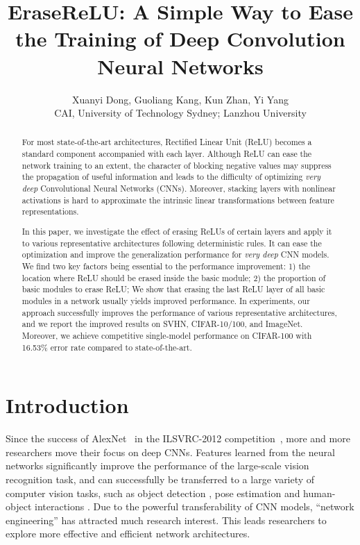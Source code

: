 \documentclass[10pt,twocolumn,letterpaper]{article}
\begin{document}
\title{EraseReLU: A Simple Way to Ease the Training of Deep Convolution Neural Networks}


\author{Xuanyi Dong, Guoliang Kang, Kun Zhan, Yi Yang\\
 CAI, University of Technology Sydney;  Lanzhou University
}

\maketitle


\begin{abstract}
For most state-of-the-art architectures, Rectified Linear Unit (ReLU) becomes a standard component accompanied with each layer. Although ReLU can ease the network training to an extent, the character of blocking negative values may suppress the propagation of useful information and leads to the difficulty of optimizing \textit{very deep} Convolutional Neural Networks (CNNs). Moreover, stacking layers with nonlinear activations is hard to approximate the intrinsic linear transformations between feature representations.

In this paper, we investigate the effect of erasing ReLUs of certain layers and apply it to various representative architectures following deterministic rules. It can ease the optimization and improve the generalization performance for \textit{very deep} CNN models. We find two key factors being essential to the performance improvement: 1) the location where ReLU should be erased inside the basic module; 2) the proportion of basic modules to erase ReLU; We show that erasing the last ReLU layer of all basic modules in a network usually yields improved performance. In experiments, our approach successfully improves the performance of various representative architectures, and we report the improved results on SVHN, CIFAR-10/100, and ImageNet. Moreover, we achieve competitive single-model performance on CIFAR-100 with 16.53\% error rate compared to state-of-the-art.
\end{abstract}

\section{Introduction}

Since the success of AlexNet~\cite{krizhevsky2012imagenet} in the ILSVRC-2012 competition~\cite{russakovsky2015imagenet}, more and more researchers move their focus on deep CNNs. Features learned from the neural networks significantly improve the performance of the large-scale vision recognition task, and can successfully be transferred to a large variety of computer vision tasks, such as object detection \cite{girshick2014rich}, pose estimation \cite{wei2016convolutional} and human-object interactions \cite{gkioxari2017interactnet}.
Due to the powerful transferability of CNN models, ``network engineering'' has attracted much research interest. This leads researchers to explore more effective and efficient network architectures.
\end{document}
